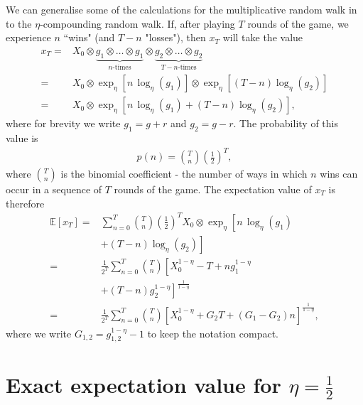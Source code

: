 \documentclass[11pt]{article}
\begin{document}
\begin{multicols}{2}
We can generalise some of the calculations for the multiplicative random walk in \cite{redner1990random} to the $\eta$-compounding random walk.  
If, after playing $T$ rounds of the game, we experience $n$ ``wins" (and $T-n$ "losses"), then $x_T$ will take the value
\begin{align*}
x_T =  &X_0\otimes \underbrace{g_1\otimes \ldots \otimes g_1}_{n\text{-times}} \otimes \underbrace{g_2\otimes \ldots \otimes g_2}_{T-n\text{-times}} \\
=& X_0\otimes\exp_\eta\left[n\,\log_\eta(g_1)\right]\! \otimes \!\exp_\eta\left[(T\!-\!n) \log_\eta(g_2) \right]\\
=& X_0\otimes \exp_\eta\left[ n\,\log_\eta(g_1) + (T\!-\!n)\log_\eta(g_2) \right],
\end{align*}
where for brevity we write $g_1 = g+r$ and $g_2 = g-r$.
The probability of this value is
\begin{align}
\label{eq:binomialDistr}
p(n) = {T \choose n} \left(\frac{1}{2}\right)^T,
\end{align}
where ${T \choose n}$ is the binomial coefficient -  the number of ways in which $n$ wins can occur in a sequence of $T$ rounds of the game.
The expectation value of $x_T$ is therefore
\begin{align}
\nonumber \mathbb{E}\left[x_T \right] =& \sum_{n=0}^T  {T \choose n} \left(\frac{1}{2}\right)^T  X_0\otimes\exp_\eta\left[ n\,\log_\eta(g_1) \right.\\
\nonumber & \left. + (T-n)\log_\eta(g_2) \right]\\
\nonumber =&   \frac{1}{2^T} \sum_{n=0}^T  {T \choose n} \left[X_0^{1-\eta } -T + n g_1^{1-\eta }\right.\\
\nonumber &\left. + (T-n) g_2^{1-\eta }\right]^{\frac{1}{1-\eta }}\\
\label{eq-expectationxT} =&  \frac{1}{2^T} \sum_{n=0}^T  {T \choose n} \left[X_0^{1-\eta }  +G_2 T + (G_1-G_2) n \right]^{\frac{1}{1-\eta }},
\end{align}
where we write $G_{1,2} = g_{1,2}^{1-\eta}-1$  to keep the notation compact.

\section{Exact expectation value for $\eta=\frac{1}{2}$}


\end{multicols}
\end{document}
